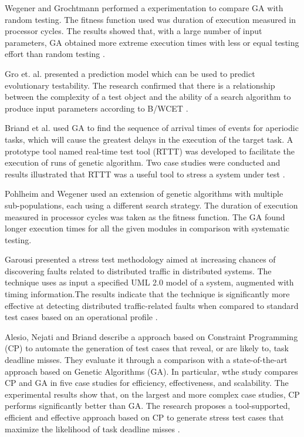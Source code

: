 Wegener and Grochtmann performed a  experimentation
to compare GA with random testing. The fitness function used was duration of execution measured in processor cycles.  The results showed that, with a large number of input parameters, GA obtained more extreme execution times with less or equal testing effort than random testing \cite{J.WegenerK.GrimmM.GrochtmannH.Sthamer1996} \cite{Wegener1998}.


Gro et. al. \cite{Gross2000} presented a prediction model  which can be used to predict evolutionary testability. The research confirmed that there is a relationship between the complexity of a test object and the ability of a search algorithm to produce input parameters according to B/WCET \cite{Gross2000}. 

Briand et al. \cite{Briand2005} used GA to find the sequence of arrival times of events for aperiodic tasks, which will cause the greatest delays in the execution of the target task. A prototype tool named real-time test tool (RTTT) was developed to facilitate the execution of runs of genetic algorithm. Two case studies were conducted and results illustrated that RTTT was a useful tool to stress a system under test \cite{Briand2005}.


Pohlheim and Wegener used an extension of genetic algorithms with multiple sub-populations, each using a different search strategy. The duration of execution measured in processor cycles was taken as the fitness
function. The GA found longer execution times for all the given modules in comparison with systematic testing\cite{Pohlheim2005}.

Garousi presented a stress test methodology aimed at increasing chances of discovering faults related to distributed traffic in distributed systems. The technique uses as input a specified UML 2.0 model of a system, augmented with timing information.The results indicate that the technique is significantly more effective at detecting distributed traffic-related faults when compared to standard test cases based on an operational profile \cite{Garousi2006}.

Alesio, Nejati and Briand describe a approach based
on Constraint Programming (CP) to automate the generation of test cases that reveal, or are likely to, task deadline misses. They evaluate it through a comparison with a state-of-the-art approach based on Genetic Algorithms (GA). In particular, wthe study compares CP and GA in five case studies for efficiency, effectiveness, and scalability. The experimental results show that, on the largest and more complex case studies, CP performs significantly better than GA. The research proposes a tool-supported, efficient and effective approach based on CP to generate stress test cases that maximize the likelihood of task deadline misses \cite{DiAlesio2013}.

